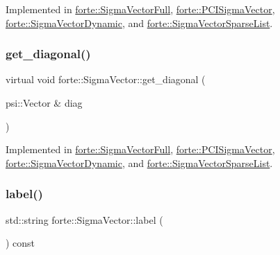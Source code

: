 Implemented in \mbox{\hyperlink{classforte_1_1_sigma_vector_full_a7415d04fe0728963ebd1b47871400aff}{forte\+::\+Sigma\+Vector\+Full}}, \mbox{\hyperlink{classforte_1_1_p_c_i_sigma_vector_a6baad8502f7305d0a4047d9092dfbd3b}{forte\+::\+P\+C\+I\+Sigma\+Vector}}, \mbox{\hyperlink{classforte_1_1_sigma_vector_dynamic_ac8aec7cf6d360cfcd391ea90f68c86ba}{forte\+::\+Sigma\+Vector\+Dynamic}}, and \mbox{\hyperlink{classforte_1_1_sigma_vector_sparse_list_a9302fb3daf4ec14c3bca274c9757f9f3}{forte\+::\+Sigma\+Vector\+Sparse\+List}}.

\mbox{\label{classforte_1_1_sigma_vector_a4df4b96c5c24a3560a874eae061a502e}} 
\subsubsection{\texorpdfstring{get\+\_\+diagonal()}{get\_diagonal()}}
{\footnotesize\ttfamily virtual void forte\+::\+Sigma\+Vector\+::get\+\_\+diagonal (\begin{DoxyParamCaption}\item[{psi\+::\+Vector \&}]{diag }\end{DoxyParamCaption})\hspace{0.3cm}{\ttfamily [pure virtual]}}



Implemented in \mbox{\hyperlink{classforte_1_1_sigma_vector_full_acee1551f85b3f744e12a49ed1e93f942}{forte\+::\+Sigma\+Vector\+Full}}, \mbox{\hyperlink{classforte_1_1_p_c_i_sigma_vector_ac6f0cf4d9b1756d07473382871f2a482}{forte\+::\+P\+C\+I\+Sigma\+Vector}}, \mbox{\hyperlink{classforte_1_1_sigma_vector_dynamic_a82c707e8e276ae30fef5d78e473eadc1}{forte\+::\+Sigma\+Vector\+Dynamic}}, and \mbox{\hyperlink{classforte_1_1_sigma_vector_sparse_list_a63742825b87a60b9ed9a175372b34fb1}{forte\+::\+Sigma\+Vector\+Sparse\+List}}.

\mbox{\label{classforte_1_1_sigma_vector_a24b95b355be4980e8507ba51a891419e}} 
\subsubsection{\texorpdfstring{label()}{label()}}
{\footnotesize\ttfamily std\+::string forte\+::\+Sigma\+Vector\+::label (\begin{DoxyParamCaption}{ }\end{DoxyParamCaption}) const\hspace{0.3cm}{\ttfamily [inline]}}

